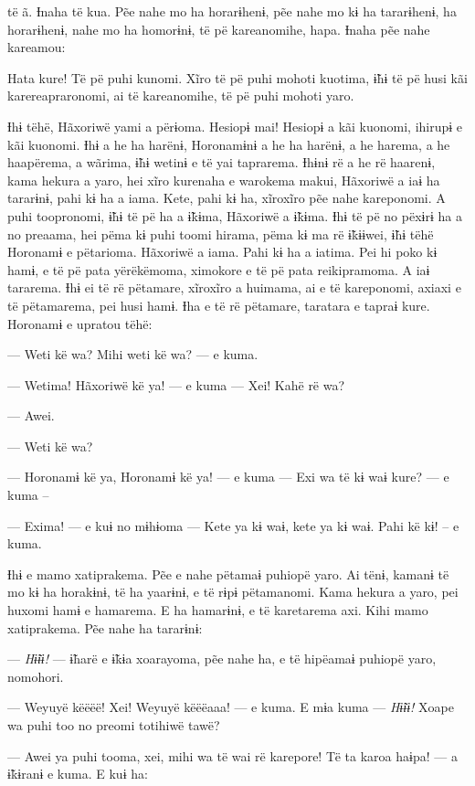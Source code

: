  të ã. Ɨnaha të kua. Pẽe nahe mo ha horarɨhenɨ, pẽe nahe mo kɨ
ha tararɨhenɨ, ha horarɨhenɨ, nahe mo ha homorɨnɨ, të pë kareanomihe,
hapa. Ɨnaha pẽe nahe kareamou: 

Hata kure! Të pë puhi kunomi. Xĩro të pë puhi mohoti kuotima, ɨ̃hɨ të pë
husi kãi karereapraronomi, ai të kareanomihe, të pë puhi mohoti yaro. 

Ɨhɨ tëhë, Hãxoriwë yami a përɨoma. Hesiopɨ mai! Hesiopɨ a kãi kuonomi,
ihirupɨ e kãi kuonomi. Ɨhɨ a he ha harënɨ, Horonamɨnɨ a he ha harënɨ, a
he harema, a he haapërema, a wãrima, ɨ̃hɨ wetinɨ e të yai taprarema.
Ɨhɨnɨ rë a he rë haarenɨ, kama hekura a yaro, hei xĩro kurenaha e
warokema makui, Hãxoriwë a iaɨ ha tararɨnɨ, pahi kɨ ha a iama. Kete,
pahi kɨ ha, xĩroxĩro pẽe nahe kareponomi. A puhi toopronomi, ɨ̃hɨ të pë
ha a ɨ̃kɨma, Hãxoriwë a ɨ̃kɨma. Ɨhɨ të pë no pëxɨrɨ ha a no preaama, hei
pëma kɨ puhi toomi hirama, pëma kɨ ma rë ɨ̃kɨɨwei, ɨ̃hɨ tëhë Horonamɨ e
pëtarioma. Hãxoriwë a iama. Pahi kɨ ha a iatima. Pei hi poko kɨ hamɨ, e
të pë pata yërëkëmoma, ximokore e të pë pata reikipramoma. A iaɨ
tararema. Ɨhɨ ei të rë pëtamare, xĩroxĩro a huimama, ai e të kareponomi,
axiaxi e të pëtamarema, pei husi hamɨ. Ɨha e të rë pëtamare, taratara e
tapraɨ kure. Horonamɨ e upratou tëhë: 

--- Weti kë wa? Mihi weti kë wa? --- e kuma. 

--- Wetima! Hãxoriwë kë ya! --- e kuma --- Xei! Kahë rë wa? 

--- Awei. 

--- Weti kë wa?

--- Horonamɨ kë ya, Horonamɨ kë ya! --- e kuma --- Exi wa të kɨ waɨ kure?
--- e kuma -- 

--- Exima! --- e kuɨ no mɨhɨoma --- Kete ya kɨ waɨ, kete ya kɨ waɨ. Pahi kë
kɨ! -- e kuma. 

Ɨhɨ e mamo xatiprakema. Pẽe e nahe pëtamaɨ puhiopë yaro. Ai tënɨ, kamanɨ
të mo kɨ ha horakɨnɨ, të ha yaarɨnɨ, e të rɨpɨ pëtamanomi. Kama hekura a
yaro, pei huxomi hamɨ e hamarema. E ha hamarɨnɨ, e të karetarema axi.
Kihi mamo xatiprakema. Pẽe nahe ha tararɨnɨ: 

--- \textit{Hɨ̃ɨɨ! }--- ɨ̃harë e ɨ̃kɨa xoarayoma, pẽe nahe ha, e të hipëamaɨ puhiopë
yaro, nomohori. 

--- Weyuyë këëëë! Xei! Weyuyë këëëaaa! --- e kuma. E mɨa kuma --- \textit{Hɨ̃ɨɨ!
}Xoape wa puhi too no preomi totihiwë tawë?

--- Awei ya puhi tooma, xei, mihi wa të wai rë karepore! Të ta karoa haɨpa!
--- a ɨ̃kɨranɨ e kuma. E kuɨ ha: 

